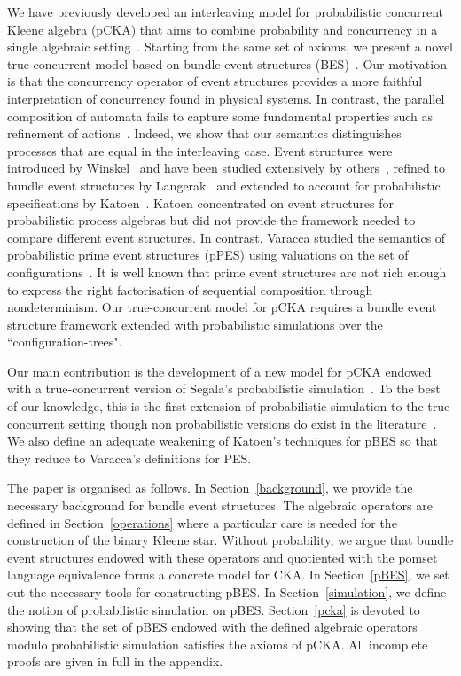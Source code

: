 \documentclass{llncs}
\newcommand{\<}{\langle}
\renewcommand{\>}{\rangle}
\begin{document}
We have previously developed an interleaving model for probabilistic concurrent Kleene algebra (pCKA) that aims to combine probability and concurrency in a single algebraic setting~\cite{Rab13}.  Starting from the same set of axioms, we present a novel true-concurrent model based on bundle event structures (BES)~\cite{Kat96,Lan92}. Our motivation is that the concurrency operator of event structures provides a more faithful interpretation of concurrency found in physical systems. In contrast, the parallel composition of automata fails to capture some fundamental properties such as refinement of actions~\cite{Gor97}. Indeed, we show that our semantics distinguishes processes that are equal in the interleaving case. Event structures were introduced by Winskel~\cite{Win86} and have been studied extensively by others~\cite{Kat96,Lan92,Gla03,Gla09}, refined to bundle event structures by Langerak~\cite{Lan92} and extended to account for probabilistic specifications by Katoen~\cite{Kat96}. Katoen concentrated on event structures for probabilistic process algebras but did not provide the framework needed to compare different event structures. In contrast, Varacca studied the semantics of probabilistic prime event structures (pPES) using valuations on the set of configurations~\cite{Var03}. It is well known that prime event structures are not rich enough to express  the right factorisation of sequential composition through nondeterminism. Our true-concurrent model for pCKA requires a bundle event structure framework extended with  probabilistic simulations over the ``configuration-trees".

Our main contribution is the development of a new model for pCKA endowed with a true-concurrent version of Segala's probabilistic simulation~\cite{Seg95}. To the best of our knowledge, this is the first extension of probabilistic  simulation to the true-concurrent setting though non probabilistic versions do exist in the literature~\cite{Che92,Maj98}. We also define an adequate weakening of Katoen's techniques for pBES so that they reduce to Varacca's definitions for PES.

The paper is organised as follows. In Section~\ref{background}, we provide the necessary background for bundle event structures. The algebraic operators are defined in Section~\ref{operations} where a particular care is needed for the construction of the binary Kleene star. Without probability, we argue that bundle event structures endowed with these operators and quotiented with the pomset language equivalence forms a concrete model for CKA. In Section~\ref{pBES}, we set out the necessary tools for constructing pBES. In Section~\ref{simulation}, we define the notion of probabilistic simulation on pBES. Section~\ref{pcka} is devoted to showing that the set of pBES endowed with the defined algebraic operators modulo probabilistic simulation satisfies the axioms of pCKA. All incomplete proofs are given in full in the appendix.
\end{document}
